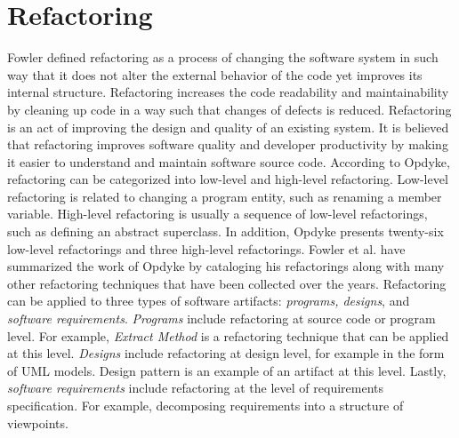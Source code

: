 
\section{Refactoring}
\label{sec:refactoring}
Fowler defined refactoring as a process of changing the software system in such way that it does not alter the external behavior of the code yet improves its internal structure\cite{fowler1999refactoring}. Refactoring increases the code readability and maintainability by cleaning up code in a way such that changes of defects is reduced\cite{fowler1999refactoring}. Refactoring is an act of improving the design and quality of an existing system\cite{Vliet:2008:SEP:1481475}. It is believed that refactoring improves software quality and developer productivity by making it easier to understand and maintain software source code\cite{Kim:2012:FSR:2393596.2393655}. According to Opdyke\cite{opdyke1992refactoring}, refactoring can be categorized into low-level and high-level refactoring. Low-level refactoring is related to changing a program entity, such as renaming a member variable. High-level refactoring is usually a sequence of low-level refactorings, such as defining an abstract superclass. In addition, Opdyke presents twenty-six low-level refactorings and three high-level refactorings. Fowler et al.\cite{fowler1999refactoring} have summarized the work of Opdyke by cataloging his refactorings along with many other refactoring techniques that have been collected over the years. Refactoring can be applied to three types of software artifacts: \textit{programs, designs}, and \textit{software requirements}. \textit{Programs} include refactoring at source code or program level. For example, \textit{Extract Method}\cite{fowler1999refactoring} is a refactoring technique that can be applied at this level. \textit{Designs} include refactoring at design level, for example in the form of UML models. Design pattern is an example of an artifact at this level. Lastly, \textit{software requirements} include refactoring at the level of requirements specification. For example, decomposing requirements into a structure of viewpoints.





